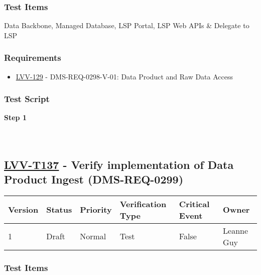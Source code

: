 \hypertarget{test-items-36}{%
\subsubsection{Test Items}\label{test-items-36}}

Data Backbone, Managed Database, LSP Portal, LSP Web APIs \& Delegate to
LSP

\hypertarget{requirements-36}{%
\subsubsection{Requirements}\label{requirements-36}}

\begin{itemize}
\tightlist
\item
  \href{https://jira.lsstcorp.org/browse/LVV-129}{LVV-129} -
  DMS-REQ-0298-V-01: Data Product and Raw Data Access
\end{itemize}

\hypertarget{test-script-36}{%
\subsubsection{Test Script}\label{test-script-36}}

\textbf{Step 1}\\
~\\
~\\

\hypertarget{lvv-t137---verify-implementation-of-data-product-ingest-dms-req-0299}{%
\subsection{\texorpdfstring{\href{https://jira.lsstcorp.org/secure/Tests.jspa\#/testCase/LVV-T137}{LVV-T137}
- Verify implementation of Data Product Ingest
(DMS-REQ-0299)}{LVV-T137 - Verify implementation of Data Product Ingest (DMS-REQ-0299)}}\label{lvv-t137---verify-implementation-of-data-product-ingest-dms-req-0299}}

\begin{longtable}[]{@{}llllll@{}}
\toprule
Version & Status & Priority & Verification Type & Critical Event &
Owner\tabularnewline
\midrule
\endhead
1 & Draft & Normal & Test & False & Leanne Guy\tabularnewline
\bottomrule
\end{longtable}

\hypertarget{test-items-37}{%
\subsubsection{Test Items}\label{test-items-37}}

